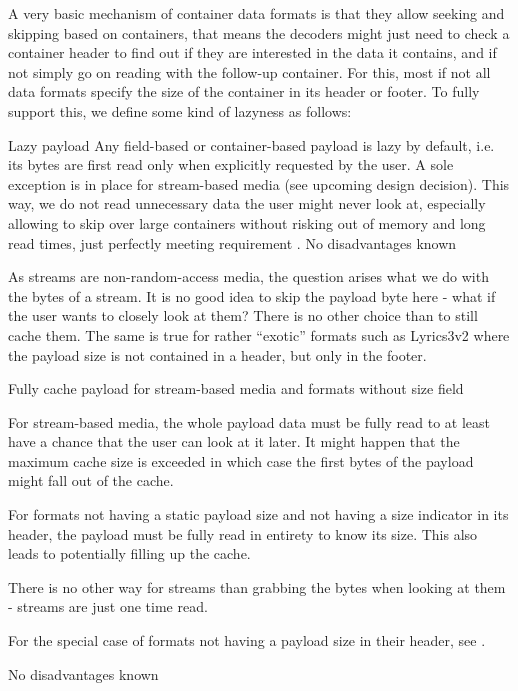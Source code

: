 A very basic mechanism of container data formats is that they allow seeking and skipping based on containers, that means the decoders might just need to check a container header to find out if they are interested in the data it contains, and if not simply go on reading with the follow-up container. For this, most if not all data formats specify the size of the container in its header or footer. To fully support this, we define some kind of lazyness as follows:

{%
Lazy payload
}
{%
Any field-based or container-based payload is lazy by default, i.e. its bytes are first read only when explicitly requested by the user. A sole exception is in place for stream-based media (see upcoming design decision). 
}
{%
This way, we do not read unnecessary data the user might never look at, especially allowing to skip over large containers without risking out of memory and long read times, just perfectly meeting requirement .
}
{%
No disadvantages known
}

As streams are non-random-access media, the question arises what we do with the bytes of a stream. It is no good idea to skip the payload byte here - what if the user wants to closely look at them? There is no other choice than to still cache them. The same is true for rather ``exotic'' formats such as Lyrics3v2 where the payload size is not contained in a header, but only in the footer.

{%
Fully cache payload for stream-based media and formats without size field
}
{%
  For stream-based media, the whole payload data must be fully read to at least have a chance that the user can look at it later. It might happen that the maximum cache size is exceeded in which case the first bytes of the payload might fall out of the cache.

For formats not having a static payload size and not having a size indicator in its header, the payload must be fully read in entirety to know its size. This also leads to potentially filling up the cache. 
}
{%
  There is no other way for streams than grabbing the bytes when looking at them - streams are just one time read.

  For the special case of formats not having a payload size in their header, see .
}
{%
No disadvantages known
}

